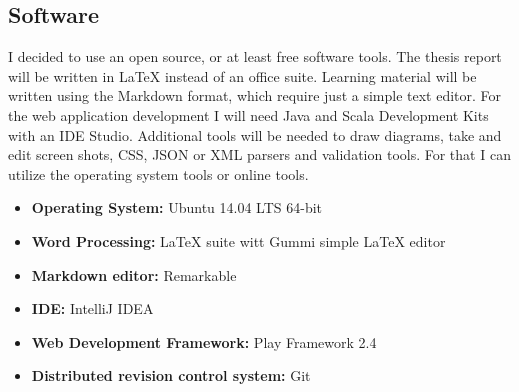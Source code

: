 \documentclass[12pt,twoside,a4paper]{report}
\begin{document}
\subsection{Software}\label{3.3.2}
I decided to use an open source, or at least free software tools. The thesis report will be written in LaTeX instead of an office suite.  Learning material will be written using the Markdown format, which require just a simple text editor. For the web application development I will need Java and Scala Development Kits with an IDE Studio. Additional tools will be needed to draw diagrams, take and edit screen shots, CSS, JSON or XML parsers and validation tools. For that I can utilize the operating system tools or online tools.
\begin{itemize}\itemsep1pt \parskip0pt 
\item \textbf{Operating System:} Ubuntu 14.04 LTS 64-bit\cite{21}
\item \textbf{Word Processing:} LaTeX suite witt Gummi simple LaTeX editor\cite{22}
\item \textbf{Markdown editor:} Remarkable\cite{23}
\item \textbf{IDE:} IntelliJ IDEA\cite{24}
\item \textbf{Web Development Framework:} Play Framework 2.4\cite{28}
\item \textbf{Distributed revision control system:} Git\cite{25}
\end{itemize}
\end{document}
